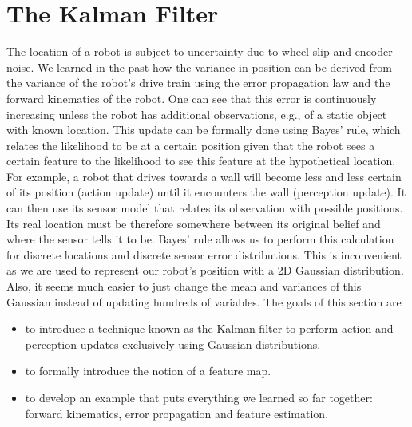 \section{The Kalman Filter}
The location of a robot is subject to uncertainty due to wheel-slip and encoder noise. We learned in the past how the variance in position can be derived from the variance of the robot's drive train using the error propagation law and the forward kinematics of the robot. One can see that this error is continuously increasing unless the robot has additional observations, e.g., of a static object with known location. This update can be formally done using Bayes' rule, which relates the likelihood to be at a certain position given that the robot sees a certain feature to the likelihood to see this feature at the hypothetical location. For example, a robot that drives towards a wall will become less and less certain of its position (action update) until it encounters the wall (perception update). It can then use its sensor model that relates its observation with possible positions. Its real location must be therefore somewhere between its original belief and where the sensor tells it to be. Bayes' rule allows us to perform this calculation for discrete locations and discrete sensor error distributions. This is inconvenient as we are used to represent our robot's position with a 2D Gaussian distribution. Also, it seems much easier to just change the mean and variances of this Gaussian instead of updating hundreds of variables. The goals of this section are
\begin{itemize}
\item to introduce a technique known as the Kalman filter to perform action and perception updates exclusively using Gaussian distributions.
\item to formally introduce the notion of a feature map.
\item to develop an example that puts everything we learned so far together: forward kinematics, error propagation and feature estimation.
\end{itemize}

